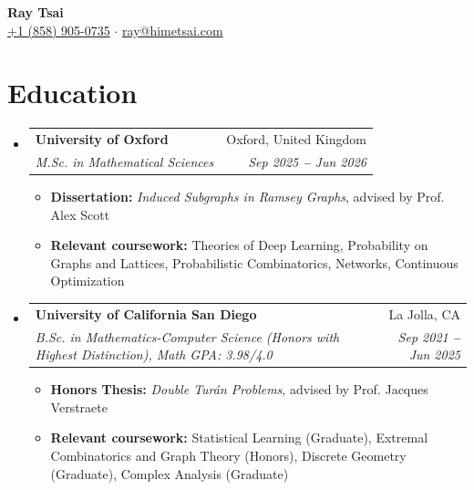 \documentclass[letterpaper,11pt]{article}
\makeatletter
\newcommand{\resumeItem}[1]{
  \item\small{
    {#1 \vspace{-1pt}}
  }
}
\newcommand{\resumeEducationHeading}[4]{
  \vspace{-2pt}\item
    \begin{tabular*}{0.97\textwidth}[t]{l@{\extracolsep{\fill}}r}
      \textbf{#1} & #2 \\
      \textit{\small#3} & \textit{\small #4} \\
    \end{tabular*}\vspace{-5pt}
}
\newcommand{\resumeSubHeadingListStart}{\begin{itemize}[leftmargin=0.15in, label={}]}
\newcommand{\resumeSubHeadingListEnd}{\end{itemize}}
\newcommand{\resumeItemListStart}{\begin{itemize}\vspace{-2pt}}
\newcommand{\resumeItemListEnd}{\end{itemize}\vspace{-7pt}}
\makeatother
\begin{document}

\begin{center}
  \textbf{\Huge Ray Tsai} \\
  \vspace{8pt}
  \small
  \faMobile \hspace{.5pt} \href{tel:18589050735}{+1 (858) 905-0735}
  $\cdot$
  \faAt \hspace{.5pt} \href{mailto:ray@himetsai.com}{ray@himetsai.com}
\end{center}


\section{Education}
\resumeSubHeadingListStart
  \resumeEducationHeading{University of Oxford}{Oxford, United Kingdom}{M.Sc. in Mathematical Sciences}{Sep 2025 \textbf{--} Jun 2026}
  \resumeItemListStart
    \resumeItem{\textbf{Dissertation:} \textit{Induced Subgraphs in Ramsey Graphs}, advised by Prof. Alex Scott}
    \resumeItem{\textbf{Relevant coursework:} Theories of Deep Learning, Probability on Graphs and Lattices, Probabilistic Combinatorics, Networks, Continuous Optimization}
  \resumeItemListEnd

  \vspace{3pt}

  \resumeEducationHeading{University of California San Diego}{La Jolla, CA}{B.Sc. in Mathematics-Computer Science (Honors with Highest Distinction), Math GPA: 3.98/4.0}{Sep 2021 \textbf{--} Jun 2025}
  \resumeItemListStart
    \resumeItem{\textbf{Honors Thesis:} \textit{Double Turán Problems}, advised by Prof. Jacques Verstraete}
    \resumeItem{\textbf{Relevant coursework:} Statistical Learning (Graduate), Extremal Combinatorics and Graph Theory (Honors), Discrete Geometry (Graduate), Complex Analysis (Graduate)}
  \resumeItemListEnd
\resumeSubHeadingListEnd


\end{document}
